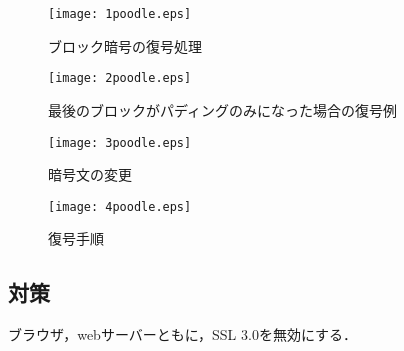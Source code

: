 \begin{figure}[h!]
\begin{center}
\texttt{[image: 1poodle.eps]}
\caption{ブロック暗号の復号処理}
\end{center}
\end{figure}

\begin{figure}[h!]
\begin{center}
\texttt{[image: 2poodle.eps]}
\caption{最後のブロックがパディングのみになった場合の復号例}
\end{center}
\end{figure}

\begin{figure}[h!]
\begin{center}
\texttt{[image: 3poodle.eps]}
\caption{暗号文の変更}
\end{center}
\end{figure}

\begin{figure}[h!]
\begin{center}
\texttt{[image: 4poodle.eps]}
\caption{復号手順}
\end{center}
\end{figure}

\subsection{対策}
ブラウザ，webサーバーともに，SSL 3.0を無効にする．
